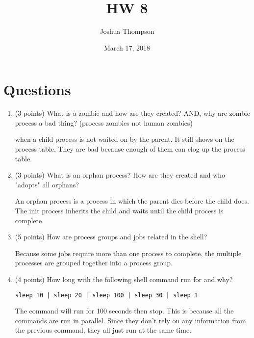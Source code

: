 \documentclass{article}[9pt]
\title{HW 8}
\author{Joshua Thompson}
\date{March 17, 2018}
\newenvironment{answerfont}{\fontfamily{qhv}\selectfont}{\par}
\newenvironment{myanswer}{\begin{mdframed}\begin{answerfont}}{\end{answerfont}\end{mdframed}}
\begin{document}
\maketitle
\section*{Questions}
\label{sec:org3ac93b9}

\begin{enumerate}
\item (3 points) What is a zombie and how are they created? AND, why are zombie
process a bad thing? (process zombies not human zombies)

  \begin{myanswer}
  when a child process is not waited on by the parent. It still shows on the process table. They are bad because enough of them can clog up the process table. 
  \end{myanswer}


\item (3 points) What is an orphan process? How are they created and who "adopts"
all orphans?

  \begin{myanswer}
  An orphan process is a process in which the parent dies before the child does. The init
  process inherits the child and waits until the child process is complete.
  \end{myanswer}

\item (5 points) How are process groups and jobs related in the shell?

  \begin{myanswer}
  Because some jobs require more than one process to complete, the multiple processes are grouped
  together into a process group.
  \end{myanswer}

\item (4 points) How long with the following shell command  run for and why?

\begin{verbatim}
sleep 10 | sleep 20 | sleep 100 | sleep 30 | sleep 1
\end{verbatim}

  \begin{myanswer}
  The command will run for 100 seconds then stop. This is because all the commands are run in
  parallel. Since they don't rely on any information from the previous command, they all just run
  at the same time.
  \end{myanswer}


\end{enumerate}
\end{document}
